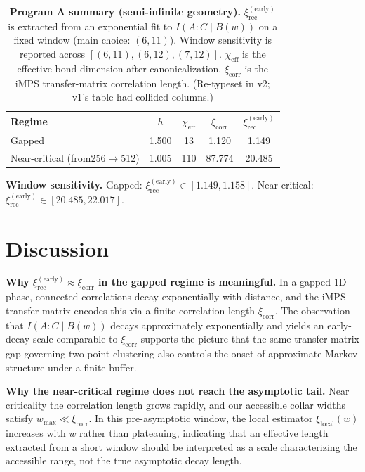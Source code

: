 \documentclass[11pt]{article}
\begin{document}
\begin{table}[H]
\centering
\caption{\textbf{Program A summary (semi-infinite geometry).}
$\xi_{\mathrm{rec}}^{(\mathrm{early})}$ is extracted from an exponential
fit to $I(A:C\mid B(w))$ on a fixed window (main choice: $(6, 11)$).
Window sensitivity is reported across $[(6,11), (6,12), (7,12)]$.
$\chi_{\mathrm{eff}}$ is the effective bond dimension after
canonicalization. $\xi_{\mathrm{corr}}$ is the iMPS transfer-matrix
correlation length. (Re-typeset in v2; v1's table had collided
columns.)}
\label{tab:programA}
\begin{tabular}{l c c c c}
\toprule
Regime & $h$ & $\chi_{\mathrm{eff}}$ & $\xi_{\mathrm{corr}}$ &
$\xi_{\mathrm{rec}}^{(\mathrm{early})}$ \\
\midrule
Gapped & 1.500 & 13 & 1.120 & 1.149 \\
Near-critical (from256$\to$512) & 1.005 & 110 & 87.774 & 20.485 \\
\bottomrule
\end{tabular}

\vspace{0.4em}
\begin{minipage}{0.94\linewidth}
\small
\textbf{Window sensitivity.} Gapped:
$\xi_{\mathrm{rec}}^{(\mathrm{early})} \in [1.149, 1.158]$.
Near-critical: $\xi_{\mathrm{rec}}^{(\mathrm{early})} \in [20.485,
22.017]$.
\end{minipage}
\end{table}

\section{Discussion}

\textbf{Why $\xi_{\mathrm{rec}}^{(\mathrm{early})} \approx
\xi_{\mathrm{corr}}$ in the gapped regime is meaningful.} In a gapped 1D
phase, connected correlations decay exponentially with distance, and the
iMPS transfer matrix encodes this via a finite correlation length
$\xi_{\mathrm{corr}}$. The observation that $I(A : C \mid B(w))$ decays
approximately exponentially and yields an early-decay scale comparable
to $\xi_{\mathrm{corr}}$ supports the picture that the same
transfer-matrix gap governing two-point clustering also controls the
onset of approximate Markov structure under a finite buffer.

\textbf{Why the near-critical regime does not reach the asymptotic
tail.} Near criticality the correlation length grows rapidly, and our
accessible collar widths satisfy $w_{\max} \ll \xi_{\mathrm{corr}}$. In
this pre-asymptotic window, the local estimator
$\xi_{\mathrm{local}}(w)$ increases with $w$ rather than plateauing,
indicating that an effective length extracted from a short window should
be interpreted as a scale characterizing the accessible range, not the
true asymptotic decay length.
\end{document}
